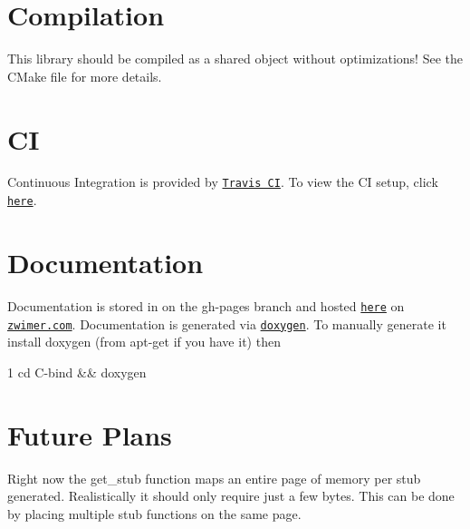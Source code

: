 \section*{Compilation}

This library should be compiled as a shared object without optimizations! See the {\ttfamily C\+Make} file for more details.

\section*{CI}

Continuous Integration is provided by \href{https://travis-ci.org}{\tt Travis CI}. To view the CI setup, click \href{https://travis-ci.org/zwimer/C-bind/}{\tt here}.

\section*{Documentation}

Documentation is stored in on the {\ttfamily gh-\/pages} branch and hosted \href{https://zwimer.github.io/C-bind/docs/html/index.html}{\tt here} on \href{https://zwimer.com}{\tt zwimer.\+com}. Documentation is generated via \href{http://www.doxygen.nl/}{\tt doxygen}. To manually generate it install doxygen (from {\ttfamily apt-\/get} if you have it) then 
\begin{DoxyCode}
1 cd C-bind && doxygen
\end{DoxyCode}


\section*{Future Plans}


\begin{DoxyEnumerate}
\item Right now the {\ttfamily get\+\_\+stub} function maps an entire page of memory per stub generated. Realistically it should only require just a few bytes. This can be done by placing multiple stub functions on the same page. 
\end{DoxyEnumerate}